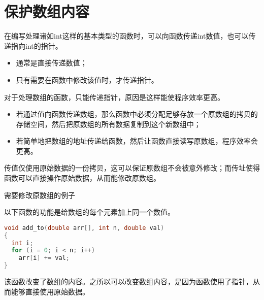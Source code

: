 \section{保护数组内容}
\begin{frame}[fragile]\ft{\secname}
在编写处理诸如int这样的基本类型的函数时，可以向函数传递int数值，也可以传递指向int的指针。\vspace{0.05in}

\begin{itemize}
\item 通常是直接传递数值；\\[0.1in]
\item 只有需要在函数中修改该值时，才传递指针。
\end{itemize}
\end{frame}


\begin{frame}[fragile]\ft{\secname}
对于处理数组的函数，只能传递指针，原因是这样能使程序效率更高。\vspace{0.05in}

\begin{itemize}
\item 若通过值向函数传递数组，那么函数中必须分配足够存放一个原数组的拷贝的存储空间，然后把原数组的所有数据复制到这个新数组中；\\[0.1in]
\item 若简单地把数组的地址传递给函数，然后让函数直接读写原数组，程序效率会更高。
\end{itemize}
\end{frame}

\begin{frame}[fragile]\ft{\secname}
传值仅使用原始数据的一份拷贝，这可以保证原数组不会被意外修改；而传址使得函数可以直接操作原始数据，从而能修改原数组。
\end{frame}

\begin{frame}[fragile]\ft{\secname}
\begin{center}
需要修改原数组的例子
\end{center}
以下函数的功能是给数组的每个元素加上同一个数值。
\begin{lstlisting}[language=c,backgroundcolor=\color{red!20}]
void add_to(double arr[], int n, double val)
{
  int i;
  for (i = 0; i < n; i++)
    arr[i] += val;
}
\end{lstlisting} \pause 
该函数改变了数组的内容。之所以可以改变数组内容，是因为函数使用了指针，从而能够直接使用原始数据。
\end{frame}

